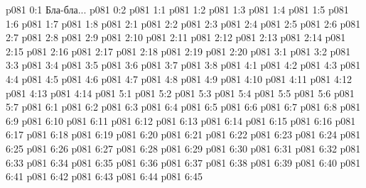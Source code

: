 \author{Архангел}
\vs p081 0:1  Бла-бла...
\vs p081 0:2 
\vs p081 1:1 
\vs p081 1:2 
\vs p081 1:3 
\vs p081 1:4 
\vs p081 1:5 
\vs p081 1:6 
\vs p081 1:7 
\vs p081 1:8 
\vs p081 2:1 
\vs p081 2:2 
\vs p081 2:3 \pc 
\vs p081 2:4 
\vs p081 2:5 
\vs p081 2:6 
\vs p081 2:7 
\vs p081 2:8 \pc 
\vs p081 2:9 
\vs p081 2:10 \pc 
\vs p081 2:11 
\vs p081 2:12 
\vs p081 2:13 \pc 
\vs p081 2:14 
\vs p081 2:15 \pc 
\vs p081 2:16 
\vs p081 2:17 
\vs p081 2:18 
\vs p081 2:19 
\vs p081 2:20 
\vs p081 3:1 
\vs p081 3:2 
\vs p081 3:3 
\vs p081 3:4 \pc 
\vs p081 3:5 
\vs p081 3:6 \pc 
\vs p081 3:7 
\vs p081 3:8 
\vs p081 4:1 
\vs p081 4:2 
\vs p081 4:3 
\vs p081 4:4 
\vs p081 4:5 
\vs p081 4:6 
\vs p081 4:7 
\vs p081 4:8 
\vs p081 4:9 \pc 
\vs p081 4:10 
\vs p081 4:11 
\vs p081 4:12 
\vs p081 4:13 
\vs p081 4:14 \pc 
{}
\vs p081 5:1 
\vs p081 5:2 
\vs p081 5:3 
\vs p081 5:4 
\vs p081 5:5 
\vs p081 5:6 
\vs p081 5:7 
\vs p081 6:1 
\vs p081 6:2 \pc 
\vs p081 6:3 
\vs p081 6:4 
\vs p081 6:5 
\vs p081 6:6 
\vs p081 6:7 
\vs p081 6:8 
\vs p081 6:9 
\vs p081 6:10 
\vs p081 6:11 
\vs p081 6:12 
\vs p081 6:13 
\vs p081 6:14 
\vs p081 6:15 
\vs p081 6:16 
\vs p081 6:17 
\vs p081 6:18 
\vs p081 6:19 
\vs p081 6:20 
\vs p081 6:21 
\vs p081 6:22 
\vs p081 6:23 
\vs p081 6:24 
\vs p081 6:25 
\vs p081 6:26 
\vs p081 6:27 
\vs p081 6:28 
\vs p081 6:29 
\vs p081 6:30 
\vs p081 6:31 
\vs p081 6:32 
\vs p081 6:33 
\vs p081 6:34 
\vs p081 6:35 
\vs p081 6:36 
\vs p081 6:37 
\vs p081 6:38 
\vs p081 6:39 
\vs p081 6:40 
\vs p081 6:41 
\vs p081 6:42 
\vs p081 6:43 
\vs p081 6:44 \pc 
\vsetoff
\vs p081 6:45 
\quizlink
